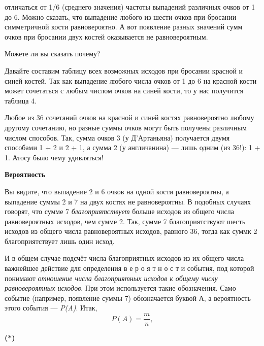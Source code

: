 \begin{multicols}{2}
\noindent
отличаться от 1/6 (среднего значения) частоты выпадений различных очков от 1 до 6. Можно сказать, что выпадение любого из шести очков при бросании симметричной кости равновероятно. А вот появление разных значений сумм очков при бросании двух костей оказывается не равновероятным.

\noindent
Можете ли вы сказать почему?

\noindent
Давайте составим таблицу всех возможных исходов при бросании красной и синей костей. Так как выпадение любого числа очков от 1 до 6 на красной кости может сочетаться с любым числом очков на синей кости, то у нас получится таблица 4.

\noindent
Любое из 36 сочетаний очков на красной и синей костях равновероятно любому другому сочетанию, но разные суммы очков могут быть получены различным числом способов. Так, сумма очков 3 (у Д'Артаньяна) получается двумя способами 1 + 2 и 2 + 1, а сумма 2 (у англичанина) --- лишь одним (из 36!): 1 + 1. Атосу было чему удивляться!

\noindent
{\bf Вероятность}

\noindent
Вы видите, что выпадение 2 и 6 очков на одной кости равновероятны, а выпадение суммы 2 и 7 на двух костях не равновероятны. В подобных случаях говорят, что сумме 7 {\it благоприятствует} больше исходов из общего числа равновероятных исходов, чем сумме 2. Так, сумме 7 благоприятствуют шесть исходов из общего числа равновероятных исходов, равного 36, тогда как суммк 2 благоприятствует лишь один исход.

\noindent
И в общем случае подсчёт числа благоприятных исходов из их общего числа - важнейшее действие для определения в е р о я т н о с т и события, под которой понимают {\it отношение числа благоприятных исходов к общему числу равновероятных исходов}. При этом используется такие обозначения. Само событие (например, появление суммы 7) обозначается буквой А, а вероятность этого события --- {\it P(A)}. Итак,
\begin{equation*}
P(A)=\frac{m}{n},
\end{equation*}
\end{multicols}


\begin{flushright}
{\bf (*)}
\end{flushright}

